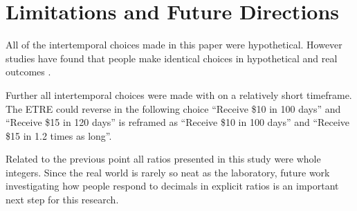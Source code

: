 \documentclass[]{article}
\begin{document}
\section{Limitations and Future Directions}

All of the intertemporal choices made in this paper were hypothetical.
However studies have found that people make identical choices in hypothetical and real outcomes \cite{Johnson2002, Bickel2009}. 

Further all intertemporal choices were made with on a relatively short timeframe.
The ETRE could reverse in the following choice ``Receive \$10 in 100 days'' and ``Receive \$15 in 120 days'' is reframed as  ``Receive \$10 in 100 days'' and ``Receive \$15 in 1.2 times as long''.

Related to the previous point all ratios presented in this study were whole integers.
Since the real world is rarely so neat as the laboratory, future work investigating how people respond to decimals in explicit ratios is an important next step for this research. 
\end{document}
